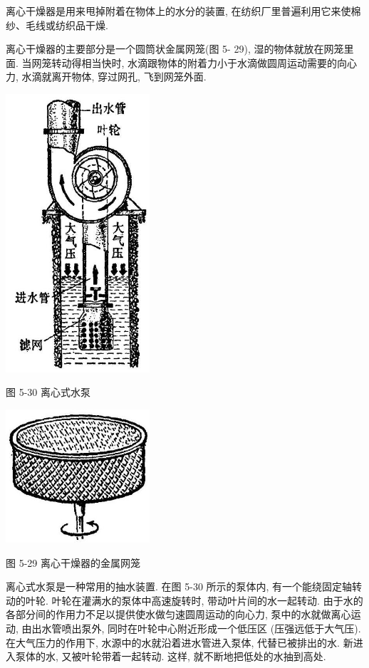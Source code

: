 \documentclass[10pt]{article}
\begin{document}
离心干燥器是用来甩掉附着在物体上的水分的装置, 在纺织厂里普遍利用它来使棉纱、毛线或纺织品干燥.

离心干燥器的主要部分是一个圆筒状金属网笼(图 5- 29), 湿的物体就放在网笼里面. 当网笼转动得相当快时, 水滴跟物体的附着力小于水滴做圆周运动需要的向心力, 水滴就离开物体, 穿过网孔, 飞到网笼外面.

\begin{center}
\includegraphics[max width=0.4\textwidth]{images/01912d55-147c-70aa-b0e0-1782a122f948_153_219737.jpg}
\end{center}

图 5-30 离心式水泵

\begin{center}
\includegraphics[max width=0.4\textwidth]{images/01912d55-147c-70aa-b0e0-1782a122f948_153_471579.jpg}
\end{center}

图 5-29 离心干燥器的金属网笼

离心式水泵是一种常用的抽水装置. 在图 5-30 所示的泵体内, 有一个能绕固定轴转动的叶轮. 叶轮在灌满水的泵体中高速旋转时, 带动叶片间的水一起转动. 由于水的各部分间的作用力不足以提供使水做匀速圆周运动的向心力, 泵中的水就做离心运动, 由出水管喷出泵外, 同时在叶轮中心附近形成一个低压区 (压强远低于大气压). 在大气压力的作用下, 水源中的水就沿着进水管进入泵体, 代替已被排出的水. 新进入泵体的水, 又被叶轮带着一起转动. 这样, 就不断地把低处的水抽到高处.
\end{document}
